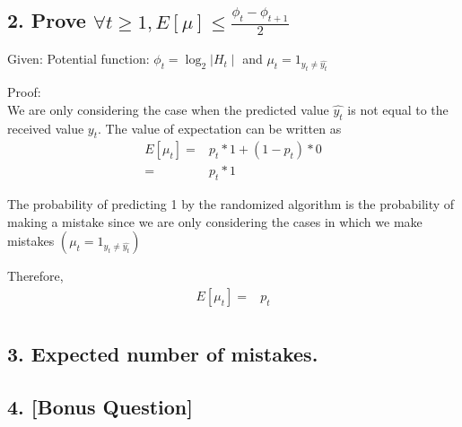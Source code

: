\documentclass{article}
\begin{document}
\subsection*{2. Prove \( \forall t \geq 1, E[\mu] \le \frac{\phi_{t} - \phi_{t+1}}{2} \)}
\begin{description}
  \item{Given:} Potential function: \( \phi_{t} = \log_2{\mid H_{t} \mid} \) and \( \mu_{t} = 1_{y_{t} \neq \hat{y_{t}} } \)
  \item{Proof:} \\
    We are only considering the case when the predicted value \( \hat{y_{t}} \) is not equal to the received value \( y_{t} \).
    The value of expectation can be written as 
    \begin{align*}
      E[\mu_{t}] =& p_{t}*1 + (1 - p_{t})*0 \\
      =& p_{t}*1
    \end{align*}

    The probability of predicting 1 by the randomized algorithm is the probability of making a mistake since we are only considering the cases in which we make mistakes \(  ( \mu_{t} = 1_{y_{t} \neq \hat{y_{t}}})\)

    Therefore, 
    \begin{align*}
      E[\mu_{t}] =& p_{t}\\
    \end{align*}

\end{description}

\subsection*{3. Expected number of mistakes.}

\subsection*{4. [Bonus Question]}
\end{document}
